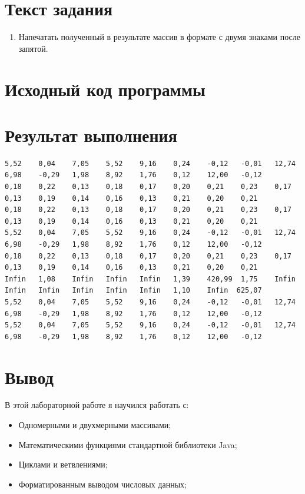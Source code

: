 \documentclass[12pt,onecolumn]{article}
\begin{document}
\section{Текст задания}
\begin{enumerate} 
 одномерный массив a типа short. Заполнить его чётными числами от 6 до 20 включительно в порядке возрастания.
 одномерный массив x типа float. Заполнить его 17-ю случайными числами в диапазоне от -3.0 до 15.0.
 двумерный массив a размером 8x17. Вычислить его элементы по следующей формуле (где x = x[j]):
\begin{itemize}  
\item если a[i] = 16, то a[i][j]=$e ^{(\frac{2}{3} + x \cdot (x-1))^3}$;
\item если $a[i] \in \{6, 12, 18, 20\}$, то $a[i][j]=\frac{1}{3}\cdot\ln((|x|+1)^x)$
\item для остальных значений a[i]: $a[i][j]=\frac{1}{2}/(3 - \arctan(\cos(x)))$.
\end{itemize}
\item Напечатать полученный в результате массив в формате с двумя знаками после запятой.
\end{enumerate}
\section{Исходный код программы}

\newpage
\section{Результат выполнения}
\begin{lstlisting}[basicstyle=\ttfamily\fontsize{6pt}{6pt}\selectfont]
5,52	0,04	7,05	5,52	9,16	0,24	-0,12	-0,01	12,74	6,98	-0,29	1,98	8,92	1,76	0,12	12,00	-0,12	
0,18	0,22	0,13	0,18	0,17	0,20	0,21	0,23	0,17	0,13	0,19	0,14	0,16	0,13	0,21	0,20	0,21	
0,18	0,22	0,13	0,18	0,17	0,20	0,21	0,23	0,17	0,13	0,19	0,14	0,16	0,13	0,21	0,20	0,21	
5,52	0,04	7,05	5,52	9,16	0,24	-0,12	-0,01	12,74	6,98	-0,29	1,98	8,92	1,76	0,12	12,00	-0,12	
0,18	0,22	0,13	0,18	0,17	0,20	0,21	0,23	0,17	0,13	0,19	0,14	0,16	0,13	0,21	0,20	0,21	
Infin	1,08	Infin	Infin	Infin	1,39	420,99	1,75	Infin	Infin	Infin	Infin	Infin	Infin	1,10	Infin  625,07	
5,52	0,04	7,05	5,52	9,16	0,24	-0,12	-0,01	12,74	6,98	-0,29	1,98	8,92	1,76	0,12	12,00	-0,12	
5,52	0,04	7,05	5,52	9,16	0,24	-0,12	-0,01	12,74	6,98	-0,29	1,98	8,92	1,76	0,12	12,00	-0,12
\end{lstlisting}
\section{Вывод}
В этой лабораторной работе я научился работать с:
\begin{itemize}
\item Одномерными и двухмерными массивами;
\item Математическими функциями стандартной библиотеки Java;
\item Циклами и ветвлениями;
\item Форматированным выводом числовых данных;


\end{itemize}
\end{document}
